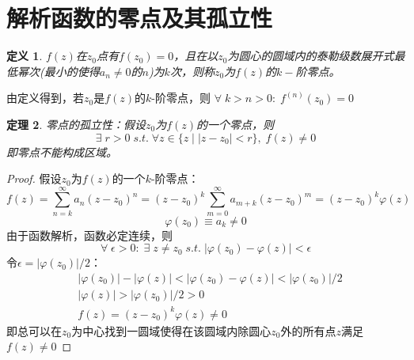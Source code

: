 \documentclass[10pt, a4paper, oneside]{ctexbook}
\newtheorem{theorem}{定理}[section]
\newtheorem{definition}[theorem]{定义}
\newcommand{\F}[1][z]
{\ensuremath{f(#1)}}
\begin{document}
\section{解析函数的零点及其孤立性}
\begin{definition}
    $\F$在$z_0$点有$f(z_0)=0$，且在以$z_0$为圆心的圆域内的泰勒级数展开式最低幂次(最小的使得$a_n\ne0$的$n$)为$k$次，则称$z_0$为$\F$的$k-$阶零点。
\end{definition}
由定义得到，若$z_0$是$\F$的$k$-阶零点，则
$\forall\;k>n>0: \; f^{(n)}(z_0)=0$
\begin{theorem}
    零点的孤立性：假设$z_0$为$\F$的一个零点，则
    $$
    \exists\; r > 0 \; s.t. \; \forall z \in \{z \mid |z-z_0|<r\},\; f(z) \ne 0
    $$
    即零点不能构成区域。
\end{theorem}
\begin{proof}
    假设$z_0$为$\F$的一个$k$-阶零点：
    $$f(z)=\sum_{n=k}^\infty a_n(z-z_0)^n=(z-z_0)^k\sum_{m=0}^\infty a_{m+k}(z-z_0)^m=(z-z_0)^k\varphi (z) $$
    $$\varphi (z_0)\equiv a_k \ne 0$$
    由于函数解析，函数必定连续，则
    $$\forall\; \epsilon>0:\; \exists \;z\ne z_0 \;s.t.\; |\varphi (z_0) - \varphi (z)|< \epsilon$$
    令$\epsilon=|\varphi (z_0)|/2$：
    \begin{align*}
        &|\varphi (z_0)| - |\varphi (z)|<|\varphi (z_0) - \varphi (z)|< |\varphi (z_0)|/2\\
        &|\varphi (z)| > |\varphi (z_0)|/2 > 0\\
        &\F=(z-z_0)^k\varphi (z)\ne0
    \end{align*}
    即总可以在$z_0$为中心找到一圆域使得在该圆域内除圆心$z_0$外的所有点$z$满足$f(z)\ne0$
\end{proof}
\end{document}
